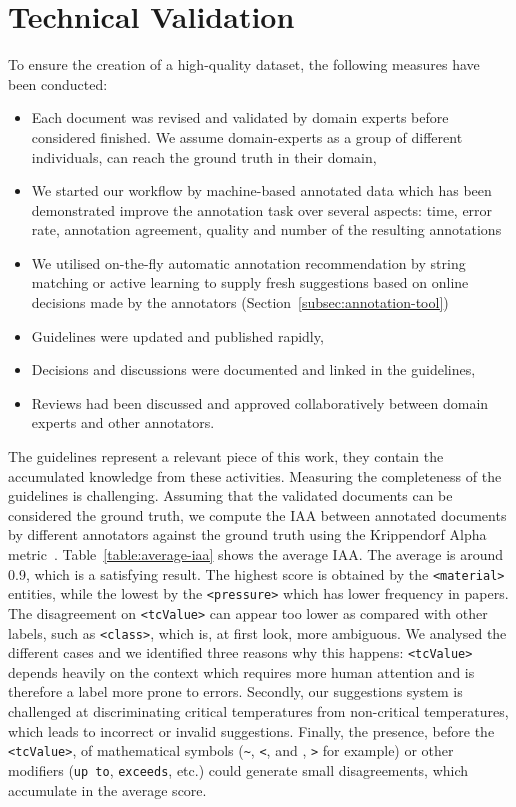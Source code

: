 \documentclass[fleqn,10pt]{wlscirep}
\begin{document}
\label{sec:technical-validation}
\section*{Technical Validation} 
To ensure the creation of a high-quality dataset, the following measures have been conducted: 
\begin{itemize}
    \item Each document was revised and validated by domain experts before considered finished. We assume  domain-experts as a group of different individuals, can reach the ground truth in their domain, 
    \item We started our workflow by machine-based annotated data which has been demonstrated improve the annotation task over several aspects: time, error rate, annotation agreement, quality and number of the resulting annotations~\cite{Fort2010InfluenceOP,Nvol2011SemiautomaticSA,Lingren2014EvaluatingTI}
    \item We utilised on-the-fly automatic annotation recommendation by string matching or active learning to supply fresh suggestions based on online decisions made by the annotators (Section~\ref{subsec:annotation-tool})
    \item Guidelines were updated and published rapidly, 
    \item Decisions and discussions were documented and linked in the guidelines, 
    \item Reviews had been discussed and approved collaboratively between domain experts and other annotators.
\end{itemize}

The guidelines represent a relevant piece of this work, they contain the accumulated knowledge from these activities.
Measuring the completeness of the guidelines is challenging. 
Assuming that the validated documents can be considered the ground truth, we compute the IAA between annotated documents by different annotators against the ground truth using the Krippendorf Alpha metric~\cite{Krippendorff2004ReliabilityIC}.
Table~\ref{table:average-iaa} shows the average IAA. The average is around 0.9, which is a satisfying result. 
The highest score is obtained by the \texttt{<material>} entities, while the lowest by the \texttt{<pressure>} which has lower frequency in papers. 
The disagreement on \texttt{<tcValue>} can appear too lower as compared with other labels, such as \texttt{<class>}, which is, at first look, more ambiguous. 
We analysed the different cases and we identified three reasons why this happens: \texttt{<tcValue>} depends heavily on the context which requires more human attention and is therefore a label more prone to errors. 
Secondly, our suggestions system is challenged at discriminating critical temperatures from non-critical temperatures, which leads to incorrect or invalid suggestions. 
Finally, the presence, before the \texttt{<tcValue>}, of mathematical symbols (\texttt{\~}, \texttt{<}, and , \texttt{>} for example) or other modifiers (\texttt{up to}, \texttt{exceeds}, etc.) could generate small disagreements, which accumulate in the average score. 
\end{document}
